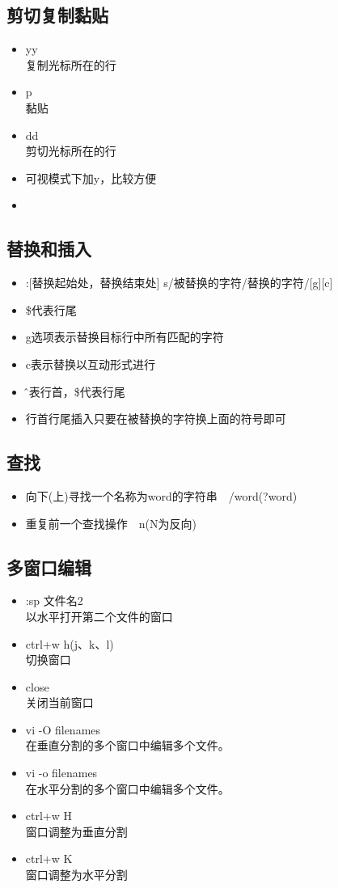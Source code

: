 \documentclass{article}
\begin{document}
\subsection{剪切复制黏贴}
	\begin{itemize}
	\item yy \\复制光标所在的行
	\item p \\黏贴
	\item dd \\剪切光标所在的行
	\item 可视模式下加y，比较方便
	\item 
	\end{itemize}
\subsection{替换和插入}
	\begin{itemize}
	\item :[替换起始处，替换结束处] s/被替换的字符/替换的字符/[g][c]
	\item \$代表行尾	
	\item g选项表示替换目标行中所有匹配的字符
	\item c表示替换以互动形式进行
	\item \^代表行首，\$代表行尾
    \item 行首行尾插入只要在被替换的字符换上面的符号即可
	\end{itemize}
\subsection{查找}
	\begin{itemize}
	\item 向下(上)寻找一个名称为word的字符串　/word(?word)
	\item 重复前一个查找操作　n(N为反向)
	\end{itemize}
\subsection{多窗口编辑}
	\begin{itemize}
	\item :sp 文件名2 \\以水平打开第二个文件的窗口
	\item ctrl+w h(j、k、l) \\切换窗口
	\item close \\关闭当前窗口
	\item vi -O filenames \\在垂直分割的多个窗口中编辑多个文件。
	\item vi -o filenames \\在水平分割的多个窗口中编辑多个文件。
	\item ctrl+w H \\窗口调整为垂直分割
	\item ctrl+w K \\窗口调整为水平分割
	\end{itemize}
\end{document}
